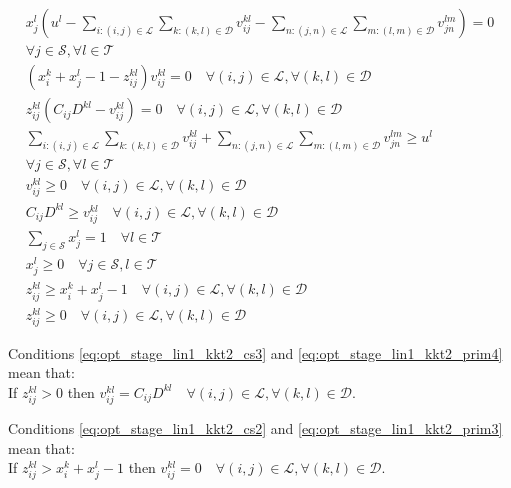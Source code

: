 \begin{subequations}\label{eq:opt_stage_lin1_kkt2}
	\begin{align}
		x_j^l\left(u^l-\sum_{i:(i,j)\in\mathcal{L}}\sum_{k:(k,l)\in\mathcal{D}}v_{ij}^{kl}-\sum_{n:(j,n)\in\mathcal{L}}\sum_{m:(l,m)\in\mathcal{D}}v_{jn}^{lm}\right) = 0 \nonumber \\
		\forall j\in\mathcal{S},\forall l\in\mathcal{T} \label{eq:opt_stage_lin1_kkt2_cs1} \\
		(x_i^k+x_j^l-1-z_{ij}^{kl})v_{ij}^{kl} = 0 \quad \forall (i,j)\in\mathcal{L}, \forall(k,l)\in\mathcal{D} \label{eq:opt_stage_lin1_kkt2_cs2}\\
		z_{ij}^{kl}\left(C_{ij}D^{kl}-v_{ij}^{kl}\right) = 0 \quad \forall (i,j)\in\mathcal{L}, \forall(k,l)\in\mathcal{D} \label{eq:opt_stage_lin1_kkt2_cs3} \\
		\sum_{i:(i,j)\in\mathcal{L}}\sum_{k:(k,l)\in\mathcal{D}}v_{ij}^{kl}+\sum_{n:(j,n)\in\mathcal{L}}\sum_{m:(l,m)\in\mathcal{D}}v_{jn}^{lm} \geq u^l \nonumber \\
		\forall j\in\mathcal{S},\forall l\in\mathcal{T} \label{eq:opt_stage_lin1_kkt2_dual1} \\
		v_{ij}^{kl} \geq 0 \quad \forall (i,j)\in\mathcal{L}, \forall(k,l)\in\mathcal{D} \label{eq:opt_stage_lin1_kkt2_dual2} \\
		C_{ij}D^{kl} \geq v_{ij}^{kl} \quad \forall (i,j)\in\mathcal{L}, \forall(k,l)\in\mathcal{D} \label{eq:opt_stage_lin1_kkt2_dual3} \\
		\sum_{j\in\mathcal{S}}x_j^l = 1 \quad \forall l\in\mathcal{T} \label{eq:opt_stage_lin1_kkt2_prim1} \\
		x_j^l \geq 0 \quad \forall j\in\mathcal{S},l\in\mathcal{T} \label{eq:opt_stage_lin1_kkt2_prim2} \\
		z_{ij}^{kl} \geq x_i^k+x_j^l-1 \quad \forall (i,j)\in\mathcal{L}, \forall(k,l)\in\mathcal{D} \label{eq:opt_stage_lin1_kkt2_prim3} \\
		z_{ij}^{kl} \geq 0 \quad \forall (i,j)\in\mathcal{L}, \forall(k,l)\in\mathcal{D} \label{eq:opt_stage_lin1_kkt2_prim4}
	\end{align}
\end{subequations}

Conditions \eqref{eq:opt_stage_lin1_kkt2_cs3} and \eqref{eq:opt_stage_lin1_kkt2_prim4} mean that:\\
If $z_{ij}^{kl}>0$ then $v_{ij}^{kl}=C_{ij}D^{kl} \quad \forall (i,j)\in\mathcal{L}, \forall(k,l)\in\mathcal{D}$.

Conditions \eqref{eq:opt_stage_lin1_kkt2_cs2} and \eqref{eq:opt_stage_lin1_kkt2_prim3} mean that:\\
If $z_{ij}^{kl}>x_i^k+x_j^l-1$ then $v_{ij}^{kl}=0 \quad \forall (i,j)\in\mathcal{L}, \forall(k,l)\in\mathcal{D}$.


